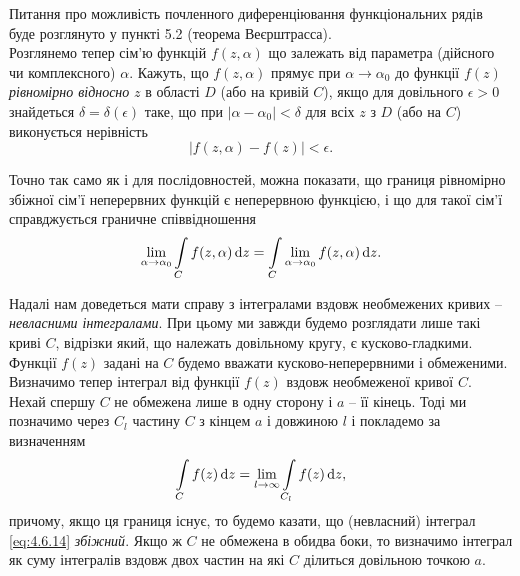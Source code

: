 Питання про можливість почленного диференціювання функціональних рядів буде розглянуто у пункті 5.2 (теорема Веєрштрасса). \\

Розглянемо тепер сім'ю функцій $f(z, \alpha)$ що залежать від параметра (дійсного чи комплексного) $\alpha$. Кажуть, що $f(z, \alpha)$ прямує при $\alpha \to \alpha_0$ до функції $f(z)$ \textit{рівномірно відносно} $z$ в області $D$ (або на кривій $C$), якщо для довільного $\epsilon > 0$ знайдеться $\delta = \delta(\epsilon)$ таке, що при $|\alpha - \alpha_0| < \delta$ для всіх $z$ з $D$ (або на $C$) виконується нерівність
\begin{equation}
	\label{eq:4.6.12}
	|f(z, \alpha) - f(z)| < \epsilon.
\end{equation}

Точно так само як і для послідовностей, можна показати, що границя рівномірно збіжної сім'ї неперервних функцій є неперервною функцією, і що для такої сім'ї справджується граничне співвідношення
\begin{equation}
	\label{eq:4.6.13}
	\displaystyle\lim\limits_{\alpha \to \alpha_0} \displaystyle\int\limits_C f(z, \alpha) \mathop{}\!\mathrm{d} z = \displaystyle\int\limits_C \displaystyle\lim\limits_{\alpha \to \alpha_0} f(z, \alpha) \mathop{}\!\mathrm{d} z.
\end{equation}

Надалі нам доведеться мати справу з інтегралами вздовж необмежених кривих -- \textit{невласними інтегралами}. При цьому ми завжди будемо розглядати лише такі криві $C$, відрізки який, що належать довільному кругу, є кусково-гладкими. Функції $f(z)$ задані на $C$ будемо вважати кусково-неперервними і обмеженими. \\

Визначимо тепер інтеграл від функції $f(z)$ вздовж необмеженої кривої $C$. Нехай спершу $C$ не обмежена лише в одну сторону і $a$ -- її кінець. Тоді ми позначимо через $C_l$ частину $C$ з кінцем $a$ і довжиною $l$ і покладемо за визначенням
\begin{equation}
	\label{eq:4.6.14}
	\displaystyle\int\limits_C f(z) \mathop{}\!\mathrm{d} z = \displaystyle\lim\limits_{l \to \infty} \displaystyle\int\limits_{C_l} f(z) \mathop{}\!\mathrm{d} z,
\end{equation}
причому, якщо ця границя існує, то будемо казати, що (невласний) інтеграл \eqref{eq:4.6.14} \textit{збіжний}. Якщо ж $C$ не обмежена в обидва боки, то визначимо інтеграл як суму інтегралів вздовж двох частин на які $C$ ділиться довільною точкою $a$. \\

